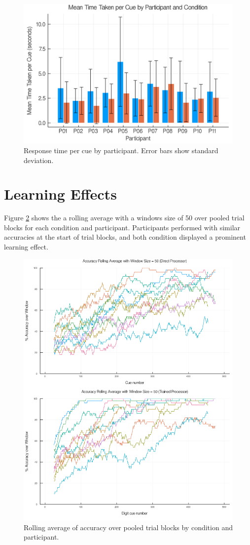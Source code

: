\documentclass[a4paper,11pt,openany]{book}
\begin{document}
\begin{figure}[htbp]
\centering
\includegraphics[width=.9\linewidth]{./images/response_time_by_participant.png}
\caption{\label{fig:org28fab1b}
Response time per cue by participant. Error bars show standard deviation.}
\end{figure}

\section*{Learning Effects}
\label{sec:orge6df518}

Figure \ref{fig:orgae82828} shows the a rolling average with a windows size of 50 over pooled trial blocks for each condition and participant.
Participants performed with similar accuracies at the start of trial blocks, and both condition displayed a prominent learning effect.

\begin{figure}[htbp]
\centering
\includegraphics[width=.9\linewidth]{./images/learning_curves.png}
\caption{\label{fig:orgae82828}
Rolling average of accuracy over pooled trial blocks by condition and participant.}
\end{figure}
\end{document}

